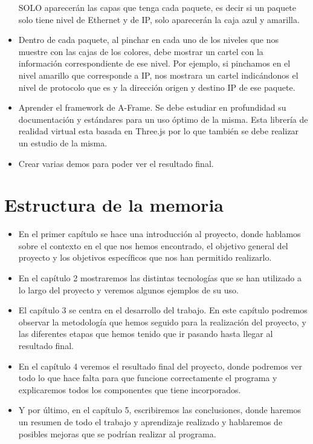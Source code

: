 \documentclass[a4paper, 12pt]{book}
\begin{document}
\begin{itemize}
SOLO aparecerán las capas que tenga cada paquete, es decir si un paquete solo tiene nivel de Ethernet y de IP, solo aparecerán la caja azul y amarilla.

\item Dentro de cada paquete, al pinchar en cada uno de los niveles que nos muestre con las cajas de los colores, debe mostrar un cartel con la información correspondiente de ese nivel. Por ejemplo, si pinchamos en el nivel amarillo que corresponde a IP, nos mostrara un cartel indicándonos el nivel de protocolo que es y la dirección origen y destino IP de ese paquete.

\item Aprender el framework de A-Frame. Se debe estudiar en profundidad su documentación y estándares para un uso óptimo de la misma. Esta librería de realidad virtual esta basada en Three.js por lo que también se debe realizar un estudio de la misma.

\item Crear varias demos para poder ver el resultado final.
\end{itemize}
\section{Estructura de la memoria}
\label{sec:estructura}

\begin{itemize}
    \item En el primer capítulo se hace una introducción al proyecto, donde hablamos sobre el contexto en el que nos hemos encontrado, el objetivo general del proyecto y los objetivos específicos que nos han permitido realizarlo.

    \item En el capítulo 2 mostraremos las distintas tecnologías que se han utilizado a lo largo del proyecto y veremos algunos ejemplos de su uso.

    \item El capítulo 3 se centra en el desarrollo del trabajo. En este capítulo podremos observar la metodología que hemos seguido para la realización del proyecto, y las diferentes etapas que hemos tenido que ir pasando hasta llegar al resultado final.

    \item En el capítulo 4 veremos el resultado final del proyecto, donde podremos ver todo lo que hace falta para que funcione correctamente el programa y explicaremos todos los componentes que tiene incorporados.

    \item Y por último, en el capítulo 5, escribiremos las conclusiones, donde haremos un resumen de todo el trabajo y aprendizaje realizado y hablaremos de posibles mejoras que se podrían realizar al programa.

\end{itemize}
\end{document}
